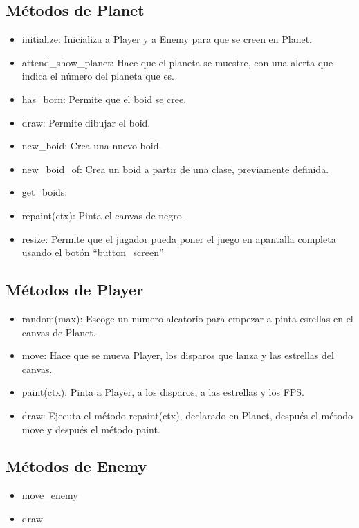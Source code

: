 \documentclass[a4paper,10pt]{article}
\begin{document}
\subsection{Métodos de Planet}
\begin{itemize}
 \item initialize: Inicializa a Player y a Enemy para que se creen en Planet.
\item attend\_show\_planet: Hace que el planeta se muestre, con una alerta que indica el número del planeta que es.
\item has\_born: Permite que el boid se cree.
\item draw: Permite dibujar el boid.
\item new\_boid: Crea una nuevo boid.
\item new\_boid\_of: Crea un boid a partir de una clase, previamente definida.
\item get\_boids: 
\item repaint(ctx): Pinta el canvas de negro.
\item resize: Permite que el jugador pueda poner el juego en apantalla completa usando el botón “button\_screen”

\end{itemize}


\subsection{Métodos de Player}
\begin{itemize}
 \item random(max): Escoge un numero aleatorio para empezar a pinta esrellas en el canvas de Planet.
\item move: Hace que se mueva Player, los disparos que lanza y las estrellas del canvas.
\item paint(ctx): Pinta a Player, a los disparos, a las estrellas y los FPS.
\item draw: Ejecuta el método repaint(ctx), declarado en Planet, después el método move y después el método paint.

\end{itemize}


\subsection{Métodos de Enemy}
\begin{itemize}
 \item move\_enemy
 \item draw
\end{itemize}
\end{document}
